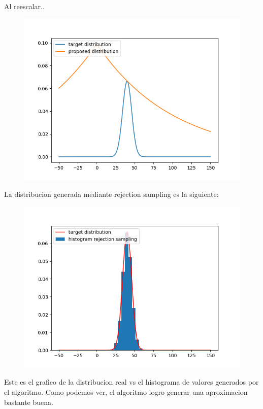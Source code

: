 \documentclass[11pt,a4paper]{article}
\begin{document}
	Al reescalar..
	\begin{figure}[H]
  			\centering
    			\includegraphics[width=18cm]{imagenes/proposed_escaled}
	\end{figure}

	La distribucion generada mediante rejection sampling es la siguiente:
	\begin{figure}[H]
  			\centering
    			\includegraphics[width=14cm]{imagenes/rejection_sampling_generated_distribution}
	\end{figure}

	Este es el grafico de la distribucion real vs el histograma de valores generados por el algoritmo. 
	Como podemos ver, el algoritmo logro generar una aproximacion bastante buena. 
\end{document}
